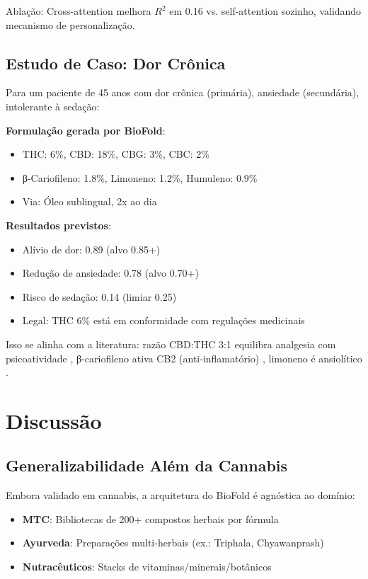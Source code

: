\documentclass[11pt,a4paper]{article}
\begin{document}
Ablação: Cross-attention melhora $R^2$ em 0.16 vs. self-attention sozinho, validando mecanismo de personalização.

\subsection{Estudo de Caso: Dor Crônica}

Para um paciente de 45 anos com dor crônica (primária), ansiedade (secundária), intolerante à sedação:

\textbf{Formulação gerada por BioFold}:
\begin{itemize}
    \item THC: 6\%, CBD: 18\%, CBG: 3\%, CBC: 2\%
    \item β-Cariofileno: 1.8\%, Limoneno: 1.2\%, Humuleno: 0.9\%
    \item Via: Óleo sublingual, 2x ao dia
\end{itemize}

\textbf{Resultados previstos}:
\begin{itemize}
    \item Alívio de dor: 0.89 (alvo 0.85+)
    \item Redução de ansiedade: 0.78 (alvo 0.70+)
    \item Risco de sedação: 0.14 (limiar 0.25)
    \item Legal: THC 6\% está em conformidade com regulações medicinais
\end{itemize}

Isso se alinha com a literatura: razão CBD:THC 3:1 equilibra analgesia com psicoatividade \cite{Russo2011}, β-cariofileno ativa CB2 (anti-inflamatório) \cite{Gertsch2008}, limoneno é ansiolítico \cite{Komiya2006}.

\section{Discussão}

\subsection{Generalizabilidade Além da Cannabis}

Embora validado em cannabis, a arquitetura do BioFold é agnóstica ao domínio:
\begin{itemize}
    \item \textbf{MTC}: Bibliotecas de 200+ compostos herbais por fórmula
    \item \textbf{Ayurveda}: Preparações multi-herbais (ex.: Triphala, Chyawanprash)
    \item \textbf{Nutracêuticos}: Stacks de vitaminas/minerais/botânicos
\end{itemize}
\end{document}
